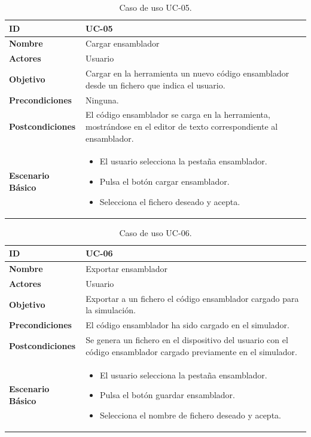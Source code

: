 \begin{center}
\begin{table}[htbp]
\centering
\caption{Caso de uso UC-05.}
\begin{tabular}{@{}p{2.5cm} p{9cm}@{}} 
\toprule
\textbf{ID}	& UC-05  \\
\midrule
\textbf{Nombre} 		& Cargar \gls{ensamblador}   \\
\midrule
\textbf{Actores} 		&	Usuario  \\
\midrule
\textbf{Objetivo} 	&	Cargar en la herramienta un nuevo código \gls{ensamblador} desde un fichero que indica el usuario. 	 \\
\midrule
\textbf{Precondiciones}	&	Ninguna.   \\
\midrule
\textbf{Postcondiciones} 	& El código \gls{ensamblador} se carga en la herramienta, mostrándose en el editor de texto correspondiente al \gls{ensamblador}.   \\
\midrule
\textbf{Escenario Básico} 	&  \begin{itemize}
\item El usuario selecciona la pestaña \gls{ensamblador}.
\item Pulsa el botón cargar \gls{ensamblador}.
\item Selecciona el fichero deseado y acepta.
\end{itemize} \\
\bottomrule
\end{tabular}
\label{tab:uc05}
\end{table}
\end{center}

\begin{center}
\begin{table}[htbp]
\centering
\caption{Caso de uso UC-06.}
\begin{tabular}{@{}p{2.5cm} p{9cm}@{}} 
\toprule
\textbf{ID}	& UC-06  \\
\midrule
\textbf{Nombre} 		& Exportar \gls{ensamblador}   \\
\midrule
\textbf{Actores} 		&	Usuario  \\
\midrule
\textbf{Objetivo} 	&	Exportar a un fichero el código \gls{ensamblador} cargado para la simulación. 	 \\
\midrule
\textbf{Precondiciones}	&	El código \gls{ensamblador} ha sido cargado en el simulador.   \\
\midrule
\textbf{Postcondiciones} 	& Se genera un fichero en el dispositivo del usuario con el código \gls{ensamblador} cargado previamente en el simulador.   \\
\midrule
\textbf{Escenario Básico} 	&  \begin{itemize}
\item El usuario selecciona la pestaña \gls{ensamblador}.
\item Pulsa el botón guardar \gls{ensamblador}.
\item Selecciona el nombre de fichero deseado y acepta.
\end{itemize} \\
\bottomrule
\end{tabular}
\label{tab:uc06}
\end{table}
\end{center}

